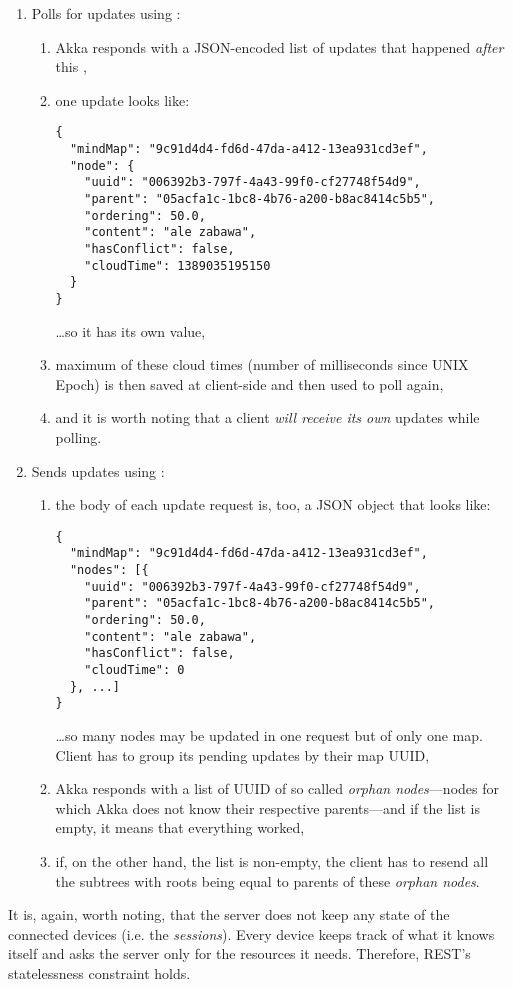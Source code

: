 \begin{enumerate}
	\item Polls for updates using : \begin{enumerate}
		\item Akka responds with a JSON-encoded list of updates that happened \emph{after} this ,
		\item one update looks like:\begin{verbatim}
{
  "mindMap": "9c91d4d4-fd6d-47da-a412-13ea931cd3ef",
  "node": {
    "uuid": "006392b3-797f-4a43-99f0-cf27748f54d9",
    "parent": "05acfa1c-1bc8-4b76-a200-b8ac8414c5b5",
    "ordering": 50.0,
    "content": "ale zabawa",
    "hasConflict": false,
    "cloudTime": 1389035195150
  }
}
		\end{verbatim}\ldots so it has its own  value,
		\item maximum of these cloud times (number of milliseconds since UNIX Epoch) is then saved at client-side and then used to poll again,
		\item and it is worth noting that a client \emph{will receive its own} updates while polling.
	\end{enumerate}
	\item Sends updates using : \begin{enumerate}
		\item the body of each update request is, too, a JSON object that looks like:\begin{verbatim}
{
  "mindMap": "9c91d4d4-fd6d-47da-a412-13ea931cd3ef",
  "nodes": [{
    "uuid": "006392b3-797f-4a43-99f0-cf27748f54d9",
    "parent": "05acfa1c-1bc8-4b76-a200-b8ac8414c5b5",
    "ordering": 50.0,
    "content": "ale zabawa",
    "hasConflict": false,
    "cloudTime": 0
  }, ...]
}
		\end{verbatim} \ldots so many nodes may be updated in one request but of only one map. Client has to group its pending updates by their map UUID,
		\item Akka responds with a list of UUID of so called \emph{orphan nodes}---nodes for which Akka does not know their respective parents---and if the list is empty, it means that everything worked,
		\item if, on the other hand, the list is non-empty, the client has to resend all the subtrees with roots being equal to parents of these \emph{orphan nodes}.
	\end{enumerate}
\end{enumerate}

It is, again, worth noting, that the server does not keep any state of the connected devices (i.e. the \emph{sessions}). Every device keeps track of what it knows itself and asks the server only for the resources it needs. Therefore, REST's statelessness constraint holds.

